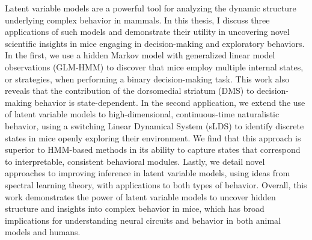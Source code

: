 Latent variable models are a powerful tool for analyzing the dynamic structure underlying complex behavior in mammals. In this thesis, I discuss three applications of such models and demonstrate their utility in uncovering novel scientific insights in mice engaging in decision-making and exploratory behaviors. In the first, we use a hidden Markov model with generalized linear model observations (GLM-HMM) to discover that mice employ multiple internal states, or strategies, when performing a binary decision-making task. This work also reveals that the contribution of the dorsomedial striatum (DMS) to decision-making behavior is state-dependent. In the second application, we extend the use of latent variable models to high-dimensional, continuous-time naturalistic behavior, using a switching Linear Dynamical System (sLDS) to identify discrete states in mice openly exploring their environment. We find that this approach is superior to HMM-based methods in its ability to capture states that correspond to interpretable, consistent behavioral modules. Lastly, we detail novel approaches to improving inference in latent variable models, using ideas from spectral learning theory, with applications to both types of behavior. Overall, this work demonstrates the power of latent variable models to uncover hidden structure and insights into complex behavior in mice, which has broad implications for understanding neural circuits and behavior in both animal models and humans.